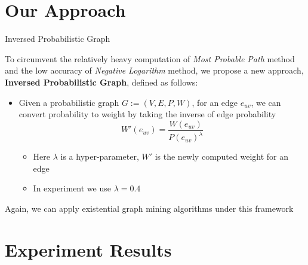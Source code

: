 \documentclass[10pt]{beamer}
\begin{document}

\section{Our Approach}
\begin{frame}[fragile]{Inversed Probabilistic Graph}



To circumvent the relatively heavy computation of \textit{Most Probable Path} method and the low accuracy of \textit{Negative Logarithm} method, we propose a new approach, \textbf{Inversed Probabilistic Graph}, defined as follows:
\begin{itemize}
\item Given a probabilistic graph $G:=(V,E,P,W)$, for an edge $e_{uv}$, we can convert probability to weight by taking the inverse of edge probability
\[ W'(e_{uv}) = \frac{W(e_{uv})}{P(e_{uv})^\lambda }\]
\vspace{-0.15in}
\begin{itemize}
\item Here $\lambda$ is a hyper-parameter, $W'$ is the newly computed weight for an edge
\item In experiment we use $\lambda = 0.4$
\end{itemize}
\end{itemize}
Again, we can apply existential graph mining algorithms under this framework
\end{frame}

\section{Experiment Results}
\end{document}
